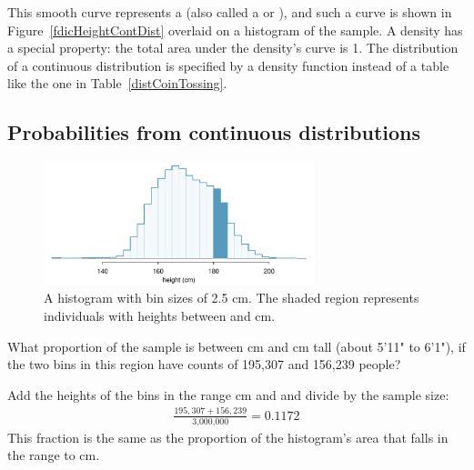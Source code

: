 This smooth curve represents a  (also called a  or ), and such a curve is shown in Figure~\ref{fdicHeightContDist} overlaid on a histogram of the sample. A density has a special property: the total area under the density's curve is 1. The distribution of a continuous distribution is specified by a density function instead of a table like the one in Table~\ref{distCoinTossing}.


\subsection{Probabilities from continuous distributions}

\begin{figure}[h!]
	\centering
	\includegraphics[width=0.7\textwidth]{ch_probability_oi_biostat/figures/usHeightsHist180185/usHeightsHist180185}
	\caption{A histogram with bin sizes of 2.5 cm. The shaded region represents individuals with heights between  and  cm. }
	\label{usHeightsHist180185}
\end{figure}

\begin{example}{What proportion of the sample is between  cm and  cm tall (about 5'11" to 6'1"), if the two bins in this region have counts of 195,307 and 156,239 people?}\label{contDistProb}
	
Add the heights of the bins in the range  cm and  and divide by the sample size:
	\begin{eqnarray*}
		\frac{195,307+156,239}{\text{3,000,000}} = 0.1172
	\end{eqnarray*}
	This fraction is the same as the proportion of the histogram's area that falls in the range  to  cm.
\end{example}


